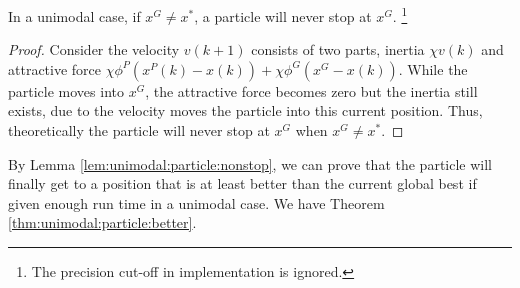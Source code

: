 \begin{mylem}
\label{lem:unimodal:particle:nonstop}
In a unimodal case, if $ x^{G} \not = x^{*} $, a particle will never stop at $ x^{G} $. 
\footnote{The precision cut-off in implementation is ignored.}
\begin{proof}
Consider the velocity $ v(k+1) $ consists of two parts, inertia $ \chi v(k) $ and attractive force $ \chi \phi^{P} (x^{P}(k) - x(k) ) + \chi \phi^{G} ( x^{G} - x(k) ) $.
While the particle moves into $ x^{G} $, the attractive force becomes zero but the inertia still exists, due to the velocity moves the particle into this current position.
Thus, theoretically the particle will never stop at $ x^{G} $ when $ x^{G} \not = x^{*} $.
\end{proof} 
\end{mylem}


By Lemma \ref{lem:unimodal:particle:nonstop}, we can prove that the particle will finally get to a position that is at least better than the current global best if given enough run time in a unimodal case.
We have Theorem \ref{thm:unimodal:particle:better}.

